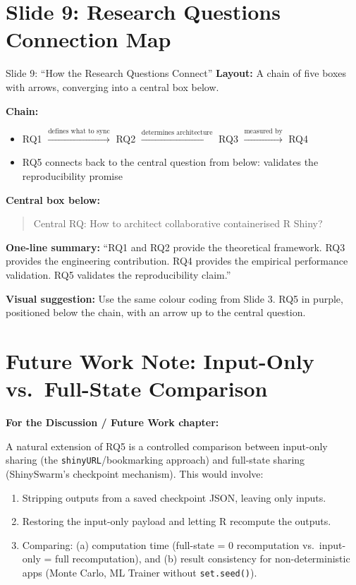 \documentclass[12pt,a4paper]{article}
\begin{document}
\section{Slide 9: Research Questions Connection Map}

\begin{slidebox}{Slide 9: ``How the Research Questions Connect''}
\textbf{Layout:} A chain of five boxes with arrows, converging into a central box below.

\textbf{Chain:}
\begin{itemize}[nosep]
  \item RQ1 $\xrightarrow{\text{defines what to sync}}$ RQ2 $\xrightarrow{\text{determines architecture}}$ RQ3 $\xrightarrow{\text{measured by}}$ RQ4
  \item RQ5 connects back to the central question from below: validates the reproducibility promise
\end{itemize}

\textbf{Central box below:}
\begin{quote}
Central RQ: How to architect collaborative containerised R Shiny?
\end{quote}

\textbf{One-line summary:}
``RQ1 and RQ2 provide the theoretical framework. RQ3 provides the engineering contribution. RQ4 provides the empirical performance validation. RQ5 validates the reproducibility claim.''

\textbf{Visual suggestion:} Use the same colour coding from Slide 3. RQ5 in purple, positioned below the chain, with an arrow up to the central question.
\end{slidebox}

\section{Future Work Note: Input-Only vs.\ Full-State Comparison}

\textbf{For the Discussion / Future Work chapter:}

A natural extension of RQ5 is a controlled comparison between input-only sharing (the \texttt{shinyURL}/bookmarking approach) and full-state sharing (ShinySwarm's checkpoint mechanism). This would involve:

\begin{enumerate}[nosep]
  \item Stripping outputs from a saved checkpoint JSON, leaving only inputs.
  \item Restoring the input-only payload and letting R recompute the outputs.
  \item Comparing: (a) computation time (full-state = 0 recomputation vs.\ input-only = full recomputation), and (b) result consistency for non-deterministic apps (Monte Carlo, ML Trainer without \texttt{set.seed()}).
\end{enumerate}
\end{document}

